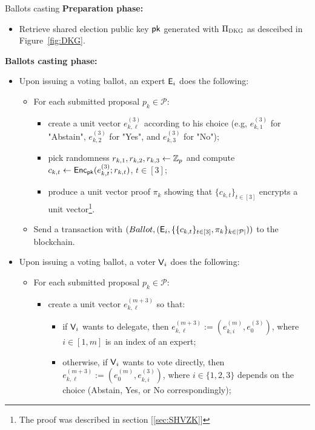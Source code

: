 \begin{boxfig}{\label{fig:private_vote}Ballots casting}{}
\footnotesize
	\textbf{Preparation phase:}
	\begin{itemize}
	    \item Retrieve shared election public key $\mathsf{pk}$ generated with $\Pi_{\textsc{DKG}}$ as desceibed in Figure~\ref{fig:DKG}.
	\end{itemize}	
	
	\textbf{Ballots casting phase:}
	\begin{itemize}
		\item Upon issuing a voting ballot, an expert $\mathsf{E}_i$ does the following:
		\begin{itemize}
			\item For each submitted proposal $p_k \in \mathcal{P}$: 
			\begin{itemize}
			    \item create a unit vector $e^{(3)}_{k,\ell}$ according to his choice (e.g, $e^{(3)}_{k,1}$ for "Abstain", $e^{(3)}_{k,2}$ for "Yes", and $e^{(3)}_{k,3}$ for "No");
			    \item pick randomness $r_{k,1},r_{k,2},r_{k,3}\leftarrow \mathbb{Z}_p$ and compute $c_{k,t}\leftarrow \mathsf{Enc}_{\mathsf{pk}}(e^{(3)}_{k,t}; r_{k,t})$, $t\in[3]$;
			    \item produce a unit vector proof $\pi_k$ showing that $\{c_{k,t}\}_{t\in[3]}$ encrypts a unit vector\footnote{The proof was described in section [\ref{sec:SHVZK}]}.
			\end{itemize}
			  
			\item Send a transaction with $(Ballot, (\mathsf{E}_i, \{\{c_{k,t}\}_{t\in[3]}, \pi_k\}_{k \in |\mathcal{P}|}))$ to the blockchain.
		\end{itemize}	
		
		\item Upon issuing a voting ballot, a voter $\mathsf{V}_i$ does the following:
		\begin{itemize}
			\item For each submitted proposal $p_k \in \mathcal{P}$: 
			\begin{itemize}
			    \item create a unit vector $e^{(m+3)}_{k,\ell}$ so that:
			    \begin{itemize}
			        \item if $\mathsf{V}_i$ wants to delegate, then $e^{(m+3)}_{k,\ell}:= (e^{(m)}_{k,i}, e^{(3)}_0)$, where $i \in [1,m]$ is an index of an expert;
			        \item otherwise, if $\mathsf{V}_i$ wants to vote directly, then $e^{(m+3)}_{k,\ell}:= (e^{(m)}_0, e^{(3)}_{k,i})$, where $i \in \{1,2,3\}$ depends on the choice (Abstain, Yes, or No correspondingly);
			    \end{itemize}


\end{itemize}
\end{itemize}
\end{itemize}
\end{boxfig}
